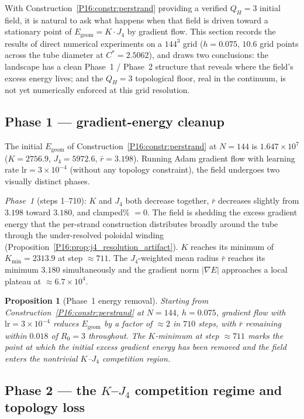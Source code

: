 \documentclass[11pt,a4paper]{article}
\newtheorem{proposition}[theorem]{Proposition}
\theoremstyle{definition}\newtheorem{definition}[theorem]{Definition}
\theoremstyle{remark}
\theoremstyle{definition}\newtheorem{construction}[theorem]{Construction}
\newcommand{\QH}{Q_H}
\begin{document}
With Construction~\ref{P16:constr:perstrand} providing a verified
$\QH=3$ initial field, it is natural to ask what happens when that
field is driven toward a stationary point of $E_{\mathrm{geom}}=K\!\cdot\!J_4$
by gradient flow.  This section records the results of direct numerical
experiments on a $144^3$ grid ($h=0.075$,
$10.6$ grid points across the tube diameter at $C^*=2.5062$), and draws
two conclusions: the landscape has a clean Phase~1 / Phase~2 structure
that reveals where the field's excess energy lives; and the
$\QH=3$ topological floor, real in the continuum, is not yet
numerically enforced at this grid resolution.

\subsection{Phase 1 --- gradient-energy cleanup}
\label{P16:sec:gf_phase1}

The initial $E_{\mathrm{geom}}$ of Construction~\ref{P16:constr:perstrand} at
$N=144$ is $1.647\times10^7$ ($K=2756.9$, $J_4=5972.6$,
$\bar r=3.198$).  Running Adam gradient flow with learning rate
$\mathrm{lr}=3\times10^{-4}$ (without any topology constraint), the
field undergoes two visually distinct phases.

\emph{Phase~1} (steps 1--710): $K$ and $J_4$ both decrease together,
$\bar r$ decreases slightly from $3.198$ toward $3.180$, and
clamped\% $=0$.  The field is shedding the excess gradient energy that
the per-strand construction distributes broadly around the tube through
the under-resolved poloidal winding (Proposition~\ref{P16:prop:j4_resolution_artifact}).
$K$ reaches its minimum of $K_{\min}=2313.9$ at step $\approx711$.
The $J_4$-weighted mean radius $\bar r$ reaches its minimum $3.180$
simultaneously and the gradient norm $|\nabla E|$ approaches a
local plateau at $\approx6.7\times10^4$.

\begin{proposition}[Phase~1 energy removal]
\label{P16:prop:gf_phase1}
Starting from Construction~\ref{P16:constr:perstrand} at $N=144$,
$h=0.075$, gradient flow with $\mathrm{lr}=3\times10^{-4}$ reduces
$E_{\mathrm{geom}}$ by a factor of $\approx2$ in $710$ steps, with
$\bar r$ remaining within $0.018$ of $R_0=3$ throughout.  The
$K$-minimum at step $\approx711$ marks the point at which the initial
excess gradient energy has been removed and the field enters the
nontrivial $K$--$J_4$ competition region.
\end{proposition}

\subsection{Phase 2 --- the $K$--$J_4$ competition regime and topology loss}
\label{P16:sec:gf_phase2}
\end{document}
